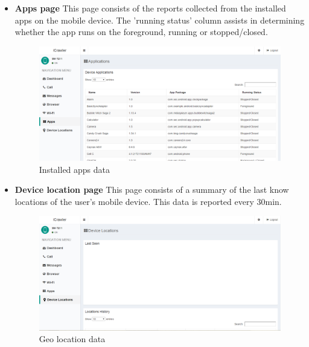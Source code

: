 \documentclass[hidelinks, 12pt, oneside]{article}
\begin{document}
\begin{itemize}
	 	 \item \textbf{Apps page}\newline
	 	This page consists of the reports collected from the installed apps on the mobile device. The 'running status' column assists in determining whether the app runs on the foreground, running or stopped/closed.
	 	 
	 	 \begin{figure}[h!]
	 	 	\caption{Installed apps data}
	 	 	\centering 																																		\includegraphics[width=1 \textwidth]{img/dashboard/dashboardApp.png}
	 	 \end{figure}\newpage	
	 	 
	 	 \item \textbf{Device location page}\newline
	 	This page consists of a summary of the last know locations of the user's mobile device. This data is reported every 30min. 
	 	 
	 	 \begin{figure}[h!]
	 	 	\caption{Geo location data}
	 	 	\centering 																																		\includegraphics[width=1 \textwidth]{img/dashboard/dashboardDeviceLocations.png}
	 	 \end{figure}\newpage	
	 	 

\end{itemize}
\end{document}
